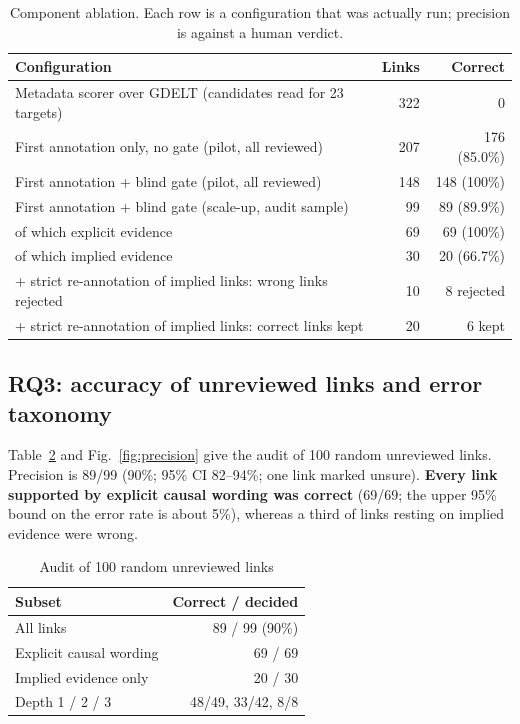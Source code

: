 \documentclass[pdflatex,sn-basic,lineno]{sn-jnl}
\theoremstyle{thmstylethree}
\theoremstyle{thmstyleone}
\begin{document}
\begin{table}[!htbp]
\caption{Component ablation. Each row is a configuration that was actually run; precision is
against a human verdict.}
\label{tab:ablation}
\footnotesize
\begin{tabularx}{\textwidth}{@{}Xrr@{}}
\toprule
Configuration & Links & Correct \\
\midrule
Metadata scorer over GDELT (candidates read for 23 targets) & 322 & 0 \\
First annotation only, no gate (pilot, all reviewed) & 207 & 176 (85.0\%) \\
First annotation + blind gate (pilot, all reviewed) & 148 & 148 (100\%) \\
First annotation + blind gate (scale-up, audit sample) & 99 & 89 (89.9\%) \\
\quad of which explicit evidence & 69 & 69 (100\%) \\
\quad of which implied evidence & 30 & 20 (66.7\%) \\
\quad + strict re-annotation of implied links: wrong links rejected & 10 & 8 rejected \\
\quad + strict re-annotation of implied links: correct links kept & 20 & 6 kept \\
\bottomrule
\end{tabularx}
\end{table}

\subsection{RQ3: accuracy of unreviewed links and error taxonomy}\label{sec:audit}
Table~\ref{tab:spot} and Fig.~\ref{fig:precision} give the audit of 100 random unreviewed links.
Precision is 89/99 (90\%; 95\% CI 82--94\%; one link marked unsure). \textbf{Every link supported by
explicit causal wording was correct} (69/69; the upper 95\% bound on the error rate is about 5\%),
whereas a third of links resting on implied evidence were wrong.

\begin{table}[!htbp]
\caption{Audit of 100 random unreviewed links}
\label{tab:spot}
\footnotesize
\begin{tabular*}{\textwidth}{@{\extracolsep\fill}lr@{}}
\toprule
Subset & Correct / decided \\
\midrule
All links & 89 / 99 (90\%) \\
Explicit causal wording & 69 / 69 \\
Implied evidence only & 20 / 30 \\
Depth 1 / 2 / 3 & 48/49, 33/42, 8/8 \\
\bottomrule
\end{tabular*}
\end{table}
\end{document}
